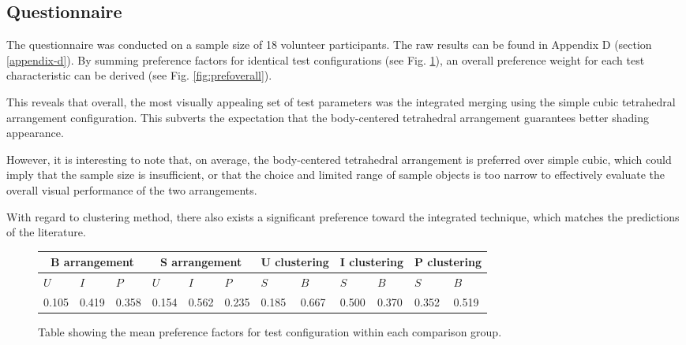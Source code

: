 \documentclass[]{article}
\begin{document}
\begin{multicols}{2}
\columnbreak

\subsection{Questionnaire}\label{questionnaire-results}

The questionnaire was conducted on a sample size of 18 volunteer participants. The raw results can be found in Appendix D (section \ref{appendix-d}). By summing preference factors for identical test configurations (see Fig. \ref{fig:preftab}), an overall preference weight for each test characteristic can be derived (see Fig. \ref{fig:prefoverall}).

This reveals that overall, the most visually appealing set of test parameters was the integrated merging using the simple cubic tetrahedral arrangement configuration. This subverts the expectation that the body-centered tetrahedral arrangement guarantees better shading appearance.

However, it is interesting to note that, on average, the body-centered tetrahedral arrangement is preferred over simple cubic, which could imply that the sample size is insufficient, or that the choice and limited range of sample objects is too narrow to effectively evaluate the overall visual performance of the two arrangements.

With regard to clustering method, there also exists a significant preference toward the integrated technique, which matches the predictions of the literature.

\end{multicols}
\begin{figure}[htb]
\centering
\begin{tabular}{|l|l|l|l|l|l|l|l|l|l|l|l|}
\hline
\multicolumn{3}{c}{B arrangement} & \multicolumn{3}{c}{S arrangement} & \multicolumn{2}{c}{U clustering} & \multicolumn{2}{c}{I clustering} & \multicolumn{2}{c}{P clustering} \\ \hline
$U$ & $I$ & $P$ & $U$ & $I$ & $P$ & $S$ & $B$ & $S$ & $B$ & $S$ & $B$ \\ \hline
0.105        & 0.419     & 0.358     & 0.154        & 0.562     & 0.235     & 0.185       & 0.667     & 0.500       & 0.370     & 0.352       & 0.519     \\ \hline
\end{tabular}
\caption{Table showing the mean preference factors for test configuration within each comparison group.}
\label{fig:preftab}
\end{figure}
\end{document}
